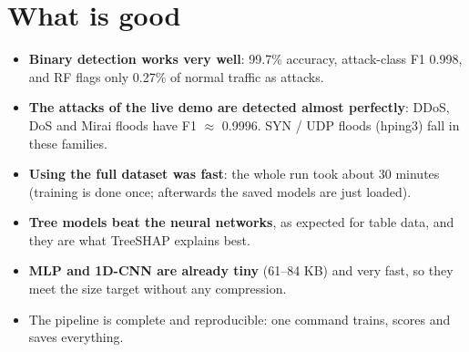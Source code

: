\documentclass[11pt]{article}
\begin{document}
\newpage
\section{What is good}
\begin{itemize}
\item \textbf{Binary detection works very well}: 99.7\% accuracy, attack-class F1 0.998, and RF flags only 0.27\% of normal traffic as attacks.
\item \textbf{The attacks of the live demo are detected almost perfectly}: DDoS, DoS and Mirai floods have F1 $\approx$ 0.9996.
SYN / UDP floods (hping3) fall in these families.
\item \textbf{Using the full dataset was fast}: the whole run took about 30 minutes (training is done once; afterwards the saved models are just loaded).
\item \textbf{Tree models beat the neural networks}, as expected for table data, and they are what TreeSHAP explains best.
\item \textbf{MLP and 1D-CNN are already tiny} (61--84 KB) and very fast, so they meet the size target without any compression.
\item The pipeline is complete and reproducible: one command trains, scores and saves everything.
\end{itemize}
\end{document}
